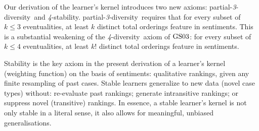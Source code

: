 \documentclass[ecta,nameyear,draft]{econsocart}
\newcommand{\stability}{\textit{4}-\textup{{stability}}}
\newcommand{\parthreediv}{\textup{partial-\textit{3}-diversity}}
\newcommand{\fourdiv}{\textit{4}-\textup{diversity}}
\newcommand{\gsii}{$\textup{GS03}$}
\theoremstyle{plain}
\theoremstyle{remark}
\begin{document}
Our derivation of the learner's kernel introduces two new axioms: \parthreediv\
and \stability. \parthreediv\ requires that for every subset of $k \leq 3$
eventualities, at least $k$ distinct total orderings feature in {sentiments}.
This is a substantial weakening of the \fourdiv\ axiom of \gsii: for
every subset of $k \leq 4$ eventualities, at least $k!$ distinct total
orderings feature in sentiments.

Stability is the key axiom in the present derivation of a learner's kernel
(weighting function) on the basis of sentiments: qualitative rankings, given
any finite resampling of past cases.
Stable learners generalize to new data (novel case types) without: re-evaluate
past rankings; generate intransitive rankings; or suppress novel (transitive)
rankings. In essence, a stable learner's kernel is not only stable in a literal
sense, it also allows for meaningful, unbiased generalisations.
 
\end{document}
